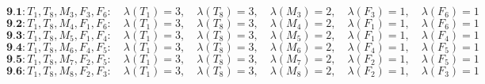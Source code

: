 \documentclass[12p]{article}
\numberwithin{equation}{section}
\begin{document}
\[
\textbf{9.1}: T_1, T_8, M_3, F_3, F_6:\quad \lambda(T_1) = 3,\quad \lambda(T_8) = 3,\quad \lambda(M_3) = 2,\quad \lambda(F_3) = 1,\quad \lambda(F_6) = 1
\]
\[
\textbf{9.2}: T_1, T_8, M_4, F_1, F_6:\quad \lambda(T_1) = 3,\quad \lambda(T_8) = 3,\quad \lambda(M_4) = 2,\quad \lambda(F_1) = 1,\quad \lambda(F_6) = 1
\]
\[
\textbf{9.3}: T_1, T_8, M_5, F_1, F_4:\quad \lambda(T_1) = 3,\quad \lambda(T_8) = 3,\quad \lambda(M_5) = 2,\quad \lambda(F_1) = 1,\quad \lambda(F_4) = 1
\]
\[
\textbf{9.4}: T_1, T_8, M_6, F_4, F_5:\quad \lambda(T_1) = 3,\quad \lambda(T_8) = 3,\quad \lambda(M_6) = 2,\quad \lambda(F_4) = 1,\quad \lambda(F_5) = 1
\]
\[
\textbf{9.5}: T_1, T_8, M_7, F_2, F_5:\quad \lambda(T_1) = 3,\quad \lambda(T_8) = 3,\quad \lambda(M_7) = 2,\quad \lambda(F_2) = 1,\quad \lambda(F_5) = 1
\]
\[
\textbf{9.6}: T_1, T_8, M_8, F_2, F_3:\quad \lambda(T_1) = 3,\quad \lambda(T_8) = 3,\quad \lambda(M_8) = 2,\quad \lambda(F_2) = 1,\quad \lambda(F_3) = 1
\]
\end{document}
